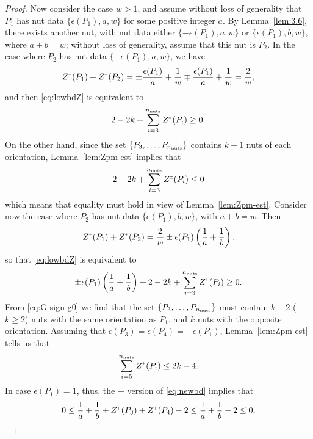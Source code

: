 \documentclass[a4paper,10pt,reqno]{amsart}
\newcommand{\nut}{P}
\theoremstyle{plain}
\newcommand{\nnuts}{n_{\text{\rm nuts}}}
\renewcommand{\P}[1]{{{#1}^{\hspace{-.5pt}\scaleto{+}{4pt}}}}
\newcommand{\PM}[1]{{{#1}^{\hspace{-.5pt}\scaleto{\pm}{3.5pt}}}}
\numberwithin{equation}{section}
\begin{document}
\begin{proof}
Now consider the case $w>1$, and assume without loss of generality that $\nut_1$ has nut data $\{\epsilon(\nut_1),a,w\}$ for some positive integer $a$. By Lemma~\ref{lem:3.6}, there exists another nut, with nut data either $\{-\epsilon(\nut_1),a,w\}$ or $\{\epsilon(\nut_1),b,w\}$, where $a+b=w$; without loss of generality, assume that this nut is $\nut_2$.
In the case where $\nut_2$ has nut data $\{-\epsilon(\nut_1),a,w\}$, we have 
\begin{align}
\PM{Z}(\nut_1) + \PM{Z}(\nut_2)
=
\pm\frac{\epsilon(\nut_1)}{a} + \frac{1}{w}\mp\frac{\epsilon(\nut_1)}{a} + \frac{1}{w}
=
\frac{2}{w},
\end{align} 
and then \eqref{eq:lowbdZ} is equivalent to 
\begin{align}
2 - 2k + \sum_{i=3}^{\nnuts}\PM{Z}(\nut_i) \geq 0.
\end{align} 
On the other hand, since the set $\{\nut_3,\dots,\nut_{\nnuts}\}$ contains $k-1$ nuts of each orientation, Lemma~\ref{lem:Zpm-est} implies that 
\begin{align} \label{eq:upbdZ}
2 - 2k + \sum_{i=3}^{\nnuts}\PM{Z}(\nut_i) \leq 0
\end{align} 
which means that equality must hold in view of Lemma~\ref{lem:Zpm-est}. Consider now the case where $\nut_2$ has nut data $\{\epsilon(\nut_1),b,w\}$, with $a+b=w$. Then 
\begin{align}
\PM{Z}(\nut_1) + \PM{Z}(\nut_2)=\frac{2}{w}\pm\epsilon(\nut_1)\left (\frac{1}{a}+\frac{1}{b} \right),
\end{align} 
so that \eqref{eq:lowbdZ} is equivalent to 
\begin{align} \label{eq:newbd}
\pm\epsilon(\nut_1)\left(\frac{1}{a}+\frac{1}{b}\right)
+2 - 2k + \sum_{i=3}^{\nnuts} \PM{Z}(\nut_i) \geq 0.
\end{align} 
From \eqref{eq:G-sign-g0} we find that the set $\{\nut_3,\dots,\nut_{\nnuts}\}$ must contain $k-2$ ($k \ge 2$) nuts with the same orientation as $\nut_1$, and $k$ nuts with the opposite orientation. Assuming that $\epsilon(\nut_3)=\epsilon(\nut_4)=-\epsilon(\nut_1)$, Lemma~\ref{lem:Zpm-est} tells us that
\begin{align}
\sum_{i=5}^{\nnuts} \PM{Z}(\nut_i) \leq 2k-4.
\end{align}
In case $\epsilon(\nut_1)=1$, thus, the $+$ version of \eqref{eq:newbd} implies that 
\begin{align} 
0\leq\frac{1}{a}+\frac{1}{b} + \P{Z}(\nut_3) + \P{Z}(\nut_4)-2\leq\frac{1}{a}+\frac{1}{b}-2\leq 0,
\end{align}

\end{proof}
\end{document}
